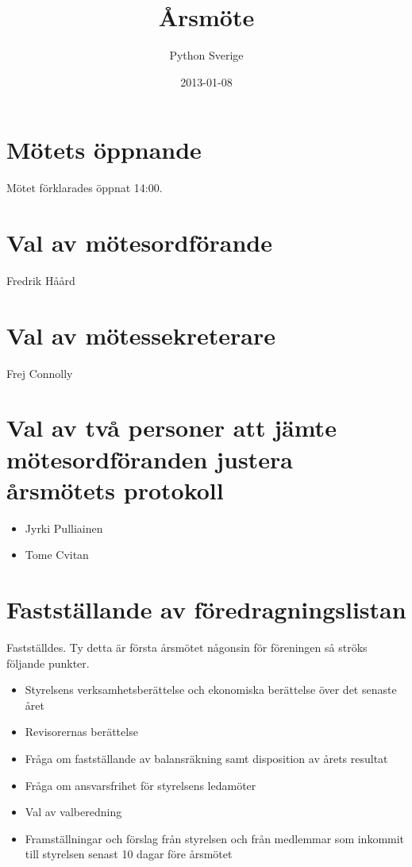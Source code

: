 \documentclass[11pt, a4paper]{article}
\title{Årsmöte}
\author{Python Sverige}
\date{2013-01-08}
\begin{document}
\maketitle

\section{Mötets öppnande}
Mötet förklarades öppnat 14:00.

\section{Val av mötesordförande}
Fredrik Håård

\section{Val av mötessekreterare}
Frej Connolly

\section{Val av två personer att jämte mötesordföranden justera årsmötets protokoll}
\begin{itemize}
    \item Jyrki Pulliainen
    \item Tome Cvitan
\end{itemize}

\section{Fastställande av föredragningslistan}
Fastställdes. Ty detta är första årsmötet någonsin för föreningen så ströks
följande punkter.

\begin{itemize}
    \item Styrelsens verksamhetsberättelse och ekonomiska berättelse över det senaste året
    \item Revisorernas berättelse
    \item Fråga om fastställande av balansräkning samt disposition av årets resultat
    \item Fråga om ansvarsfrihet för styrelsens ledamöter
    \item Val av valberedning
    \item Framställningar och förslag från styrelsen och från medlemmar som inkommit till styrelsen senast 10 dagar före årsmötet
\end{itemize}
\end{document}
